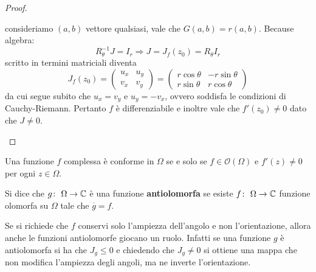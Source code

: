 \begin{proof}
\begin{enumerate}
      consideriamo $(a,b)$ vettore qualsiasi, vale che $G(a,b) = r(a,b)$.
      Because algebra: 
      \begin{equation*}
        R^{-1}_\theta J = I_r \Longrightarrow J = J_f(z_0) = R_\theta I_r
      \end{equation*}
      scritto in termini matriciali diventa
      \begin{equation*}
        J_f(z_0) = \left( 
          \begin{array}{cc}
          u_x & u_y \\
          v_x & v_y 
          \end{array}\right) = 
          \left( 
            \begin{array}{cc}
              r\cos\theta & -r\sin\theta \\
              r\sin\theta & r\cos\theta 
            \end{array}
          \right)
      \end{equation*}
      da cui segue subito che $u_x = v_y$ e $u_y = - v_x$, ovvero soddisfa le
      condizioni di Cauchy-Riemann. Pertanto $f$ è differenziabile e inoltre
      vale che $f'(z_0) \neq 0$ dato che $J \neq 0$.
  \end{enumerate}
\end{proof}

\begin{corollary}
  Una funzione $f$ complessa è conforme in $\Omega$ se e solo se $f \in
  \mathcal{O}(\Omega)$ e $f'(z) \neq 0$ per ogni $z \in \Omega$. 
  \label{cor:estensione_teorema_conformita}
\end{corollary}

\begin{definition}
  Si dice che $g \colon\ \Omega \rightarrow \mathbb{C}$ è una funzione \textbf{antiolomorfa} se
  esiste $f \colon\ \Omega \rightarrow \mathbb{C}$ funzione olomorfa su $\Omega$ tale che
  $\overline{g} = f$.
  \label{def:antiolomorfa}
\end{definition}

\begin{remark}
  Se si richiede che $f$ conservi solo l'ampiezza dell'angolo e non
  l'orientazione, allora anche le funzioni antiolomorfe giocano un ruolo.
  Infatti se una funzione $g$ è antiolomorfa si ha che $J_g \le 0$ e chiedendo
  che $J_g \neq 0$ si ottiene una mappa che non modifica l'ampiezza degli
  angoli, ma ne inverte l'orientazione.  
  \label{rmk:anticonformita}
\end{remark}

